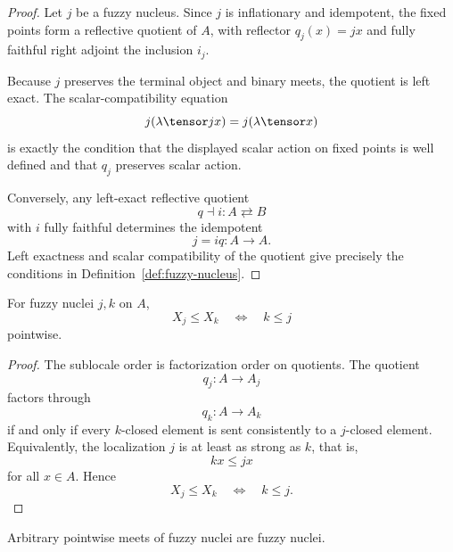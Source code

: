 \begin{proof}
Let \(j\) be a fuzzy nucleus.  Since \(j\) is inflationary and idempotent, the
fixed points form a reflective quotient of \(A\), with reflector \(q_j(x)=jx\)
and fully faithful right adjoint the inclusion \(i_j\).

Because \(j\) preserves the terminal object and binary meets, the quotient is
left exact.  The scalar-compatibility equation
\[
    j(\lambda\tensor jx)=j(\lambda\tensor x)
\]
is exactly the condition that the displayed scalar action on fixed points is
well defined and that \(q_j\) preserves scalar action.

Conversely, any left-exact reflective quotient
\[
    q\dashv i:A\rightleftarrows B
\]
with \(i\) fully faithful determines the idempotent
\[
    j=iq:A\to A.
\]
Left exactness and scalar compatibility of the quotient give precisely the
conditions in Definition~\ref{def:fuzzy-nucleus}.
\end{proof}

\begin{proposition}
\label{prop:sublocale-order-nuclei}
For fuzzy nuclei \(j,k\) on \(A\),
\[
    X_j\leq X_k
    \quad\Longleftrightarrow\quad
    k\leq j
\]
pointwise.
\end{proposition}

\begin{proof}
The sublocale order is factorization order on quotients.  The quotient
\[
    q_j:A\to A_j
\]
factors through
\[
    q_k:A\to A_k
\]
if and only if every \(k\)-closed element is sent consistently to a \(j\)-closed
element.  Equivalently, the localization \(j\) is at least as strong as \(k\),
that is,
\[
    kx\leq jx
\]
for all \(x\in A\).  Hence
\[
    X_j\leq X_k
    \quad\Longleftrightarrow\quad
    k\leq j.
\]
\end{proof}

\begin{lemma}
\label{lem:meets-of-fuzzy-nuclei}
Arbitrary pointwise meets of fuzzy nuclei are fuzzy nuclei.
\end{lemma}

